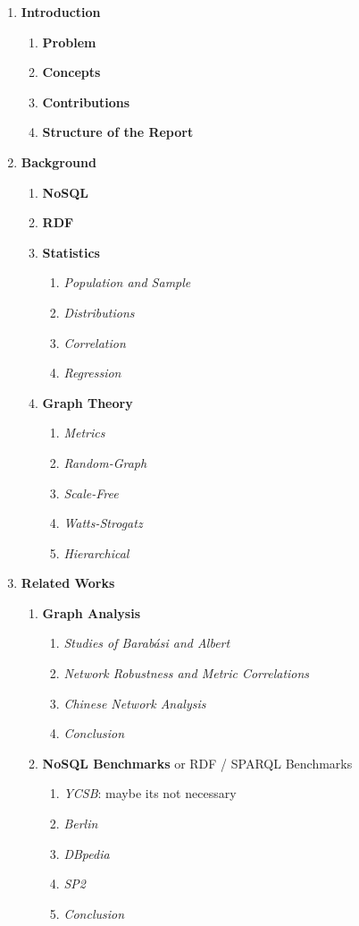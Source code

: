 \newpage
\begin{enumerate}
	\item \textbf{Introduction}
	\begin{enumerate}[label*=\arabic*.]
		\item \textbf{Problem}
		\item \textbf{Concepts}
			\item \textbf{Contributions}
			\item \textbf{Structure of the Report}
		\end{enumerate}
		\item \textbf{Background}
		\begin{enumerate}[label*=\arabic*.]
			\item \textbf{NoSQL}
			\item \textbf{RDF}
			\item \textbf{Statistics}
			\begin{enumerate}[label*=\arabic*.]
				\item \textit{Population and Sample}
				\item \textit{Distributions}
				\item \textit{Correlation}
				\item \textit{Regression}
			\end{enumerate}
			\item \textbf{Graph Theory}
			\begin{enumerate}[label*=\arabic*.]
				\item \textit{Metrics}
				\item \textit{Random-Graph}
				\item \textit{Scale-Free}
				\item \textit{Watts-Strogatz}
				\item \textit{Hierarchical}
			\end{enumerate}
		\end{enumerate}
	
	
	\item \textbf{Related Works}
	\begin{enumerate}[label*=\arabic*.]
		\item \textbf{Graph Analysis}
		\begin{enumerate}[label*=\arabic*.]
			\item \textit{Studies of Barabási and Albert}
			\item \textit{Network Robustness and Metric Correlations}
			\item \textit{Chinese Network Analysis}
			\item \textit{Conclusion}
		\end{enumerate}
		\item \textbf{NoSQL Benchmarks} or RDF / SPARQL Benchmarks
		\begin{enumerate}[label*=\arabic*.]
			\item \textit{YCSB}: maybe its not necessary
			\item \textit{Berlin}
			\item \textit{DBpedia}
			\item \textit{SP2}
			\item \textit{Conclusion}
		\end{enumerate}
	\end{enumerate}
	

\end{enumerate}
